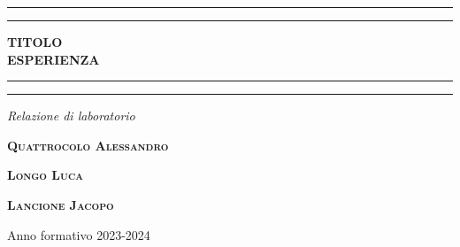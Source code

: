  \begin{titlepage} 
	\centering 
	\scshape 
	
	\vspace*{\baselineskip}
	\rule{\textwidth}{1.6pt}\vspace*{-\baselineskip}\vspace*{2pt} 
	\rule{\textwidth}{0.4pt} 
	
	\vspace{0.75\baselineskip} 
	
	\textbf{\LARGE TITOLO\\ ESPERIENZA\\} 
	
	\vspace{0.75\baselineskip} 
	
	\rule{\textwidth}{0.4pt}\vspace*{-\baselineskip}\vspace{3.2pt} 
	\rule{\textwidth}{1.6pt} 
	
	\vspace{2\baselineskip}
	
	\textit{Relazione di laboratorio} 
	
	\vspace*{3\baselineskip} 


 
	\vspace{0.5\baselineskip} 
	
	\textbf{\scshape\Large Quattrocolo Alessandro }
 
    \vspace{0.3in}
    \textbf{\scshape\Large Longo Luca }
 
    \vspace{0.3in}
    \textbf{\scshape\Large Lancione Jacopo } 
	
	\vspace{4.5\baselineskip} 
	
	\vfill
	
	\vspace{0.3\baselineskip} 
	
	Anno formativo 2023-2024 
	
\end{titlepage}



